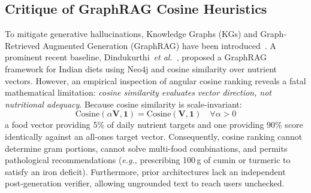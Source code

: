 \documentclass[5p,times,twocolumn]{elsarticle}
\newcommand{\eg}{\textit{e.g.}}
\newcommand{\etal}{\textit{et al.}}
\begin{document}
\subsection{Critique of GraphRAG Cosine Heuristics}
To mitigate generative hallucinations, Knowledge Graphs (KGs) and Graph-Retrieved Augmented Generation (GraphRAG) have been introduced~\cite{edge2024graphrag, pan2024roadmap}. A prominent recent baseline, Dindukurthi~\etal{}~\cite{dindukurthi2026graphrag}, proposed a GraphRAG framework for Indian diets using Neo4j and cosine similarity over nutrient vectors. However, an empirical inspection of angular cosine ranking reveals a fatal mathematical limitation: \textit{cosine similarity evaluates vector direction, not nutritional adequacy}. Because cosine similarity is scale-invariant:
\begin{equation}
\text{Cosine}(\alpha \mathbf{V}, \mathbf{1}) = \text{Cosine}(\mathbf{V}, \mathbf{1}) \quad \forall \alpha > 0
\end{equation}
a food vector providing 5\% of daily nutrient targets and one providing 90\% score identically against an all-ones target vector. Consequently, cosine ranking cannot determine gram portions, cannot solve multi-food combinations, and permits pathological recommendations (\eg{}, prescribing 100\,g of cumin or turmeric to satisfy an iron deficit). Furthermore, prior architectures lack an independent post-generation verifier, allowing ungrounded text to reach users unchecked.
\end{document}
